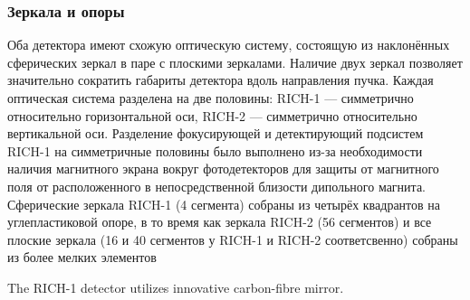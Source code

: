 \subsubsection{Зеркала и опоры}

Оба детектора имеют схожую оптическую систему, состоящую из наклонённых сферических зеркал в паре с плоскими зеркалами. Наличие двух зеркал позволяет значительно сократить габариты детектора вдоль направления пучка. Каждая оптическая система разделена на две половины: \mbox{RICH-1} --- симметрично относительно горизонтальной оси, \mbox{RICH-2} --- симметрично относительно вертикальной оси. Разделение фокусирующей и детектирующий подсистем \mbox{RICH-1} на симметричные половины было выполнено из-за необходимости наличия магнитного экрана вокруг фотодетекторов для защиты от магнитного поля от расположенного в непосредственной близости дипольного магнита.
Сферические зеркала \mbox{RICH-1} (4 сегмента) собраны из четырёх квадрантов на углепластиковой опоре, в то время как зеркала \mbox{RICH-2} (56 сегментов) и все плоские зеркала (16 и 40 сегментов у \mbox{RICH-1} и \mbox{RICH-2} соответсвенно) собраны из более мелких элементов \todo

The \mbox{RICH-1} detector utilizes innovative carbon-fibre mirror. \todo




\todo



